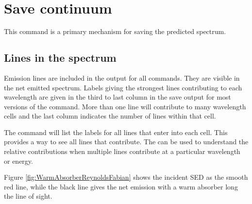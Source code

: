 \section{Save continuum}
\label{sec:CommandSaveContinuum}

This command is a primary mechanism for saving the predicted
spectrum.

\subsection{Lines in the spectrum}

Emission lines are included in the output for all
 commands.
They are visible in the net emitted spectrum.
Labels giving the strongest lines contributing to each wavelength
are given in the third to last column in the save output
for most versions of the  command.
More than one
line will contribute to many wavelength cells and the last column indicates
the number of lines within that cell.

The  command will list
the labels for all lines that enter into each cell.
This provides a way
to see all lines that contribute.
The  can be used to understand the 
relative contributions when multiple lines contribute
at a particular wavelength or energy.

Figure \ref{fig:WarmAbsorberReynoldsFabian} shows the incident
SED as the smooth red line, while the black line gives 
the net emission with a warm absorber long the line of sight. 


